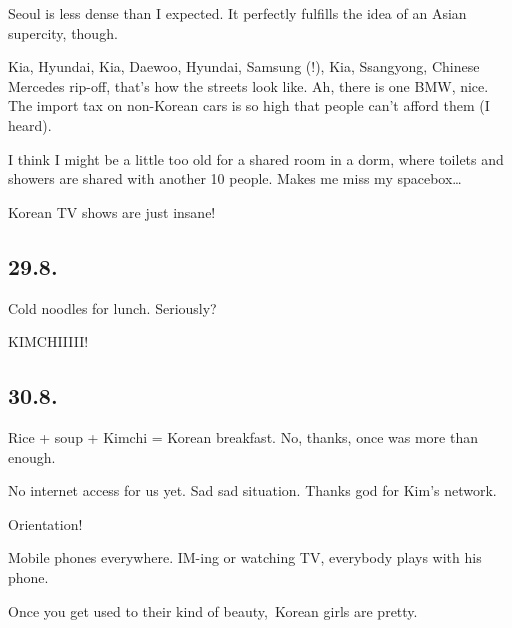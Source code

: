 \begin{post}
\begin{content}
\begin{itemize*}
	\item Seoul is less dense than I expected. It perfectly fulfills the idea of an Asian supercity, though.

	\item Kia, Hyundai, Kia, Daewoo, Hyundai, Samsung (!), Kia, Ssangyong, Chinese Mercedes rip-off, that's how the streets look like. Ah, there is one BMW, nice. The import tax on non-Korean cars is so high that people can't afford them (I heard).

	\item I think I might be a little too old for a shared room in a dorm, where toilets and showers are shared with another 10 people. Makes me miss my spacebox\ldots

	\item Korean TV shows are just insane!

\end{itemize*}

\subsection{29.8.}

\begin{itemize*}

	\item Cold noodles for lunch. Seriously?

	\item KIMCHIIIII!

\end{itemize*}

\subsection{30.8.}

\begin{itemize*}

	\item Rice + soup + Kimchi = Korean breakfast. No, thanks, once was more than enough.

	\item No internet access for us yet. Sad sad situation. Thanks god for Kim's network.

	\item Orientation!

	\item Mobile phones everywhere. IM-ing or watching TV, everybody plays with his phone.

	\item Once you get used to their kind of beauty, Korean girls are pretty.


\end{itemize*}
\end{content}
\end{post}
